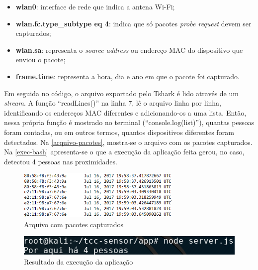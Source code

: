 \begin{itemize}
  \item \textbf{wlan0}: interface de rede que indica a antena Wi-Fi;
  \item \textbf{wlan.fc.type\_subtype eq 4}: indica que só pacotes \emph{probe request} devem ser capturados;
  \item \textbf{wlan.sa}: representa o \emph{source address} ou endereço MAC do dispositivo que enviou o pacote;
  \item \textbf{frame.time}: representa a hora, dia e ano em que o pacote foi capturado.
\end{itemize}

Em seguida no código, o arquivo exportado pelo Tshark é lido através de um \emph{stream}. A função ``readLines()''
na linha 7, lê o arquivo linha por linha, identificando os endereços MAC diferentes e adicionando-os a uma lista.
Então, nessa própria função é mostrado no terminal (``console.log(list)''), quantas pessoas foram contadas, ou em outros termos,
quantos dispositivos diferentes foram detectados. Na \autoref{arquivo-pacotes}, mostra-se o arquivo com os pacotes
capturados. Na \autoref{exec-bash} apresenta-se o que a execução da aplicação feita gerou, no caso, detectou
4 pessoas nas proximidades.

\begin{figure}[!h]
  \caption{\label{arquivo-pacotes}Arquivo com pacotes capturados}
  \begin{center}
    \includegraphics[width=0.70\textwidth]{img/packets.png}
  \end{center}
\end{figure}

\begin{figure}[!h]
  \caption{\label{exec-bash}Resultado da execução da aplicação}
  \begin{center}
    \includegraphics[width=1.0\textwidth]{img/bash.png}
  \end{center}
\end{figure}
